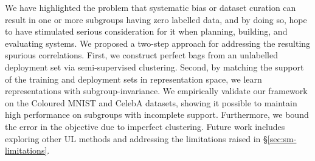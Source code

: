 %
We have highlighted the problem that systematic bias or dataset curation can result in one or more
subgroups having zero labelled data, and by doing so, hope to have stimulated serious consideration
for it when planning, building, and evaluating systems.
%
We proposed a two-step approach for addressing the resulting spurious correlations.
%
First, we construct perfect bags from an unlabelled deployment set via semi-supervised clustering. 
%
Second, by matching the support of the training and deployment sets in representation space, we
learn representations with subgroup-invariance.
%
We empirically validate our frame\-work on the Coloured MNIST and CelebA datasets, showing it
possible to maintain high performance on subgroups with incomplete support.
%
Furthermore, we bound the error in the objective due to imperfect clustering.
%
Future work includes exploring other \ac{UL} methods and addressing the limitations raised in
\S\ref{sec:sm-limitations}.

